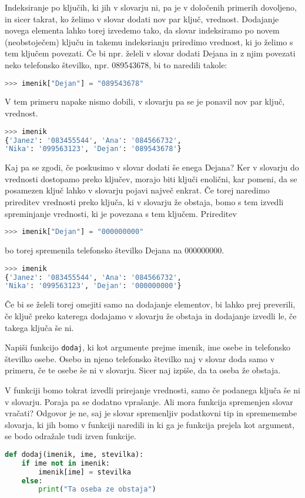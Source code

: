 Indeksiranje po ključih, ki jih v slovarju ni, pa je v določenih primerih dovoljeno, in sicer takrat, ko želimo v slovar dodati nov par ključ, vrednost. Dodajanje novega elementa lahko torej izvedemo tako, da slovar indeksiramo po novem (neobstoječem) ključu in takemu indeksrianju priredimo vrednost, ki jo želimo s tem ključem povezati. Če bi npr. želeli v slovar dodati Dejana in z njim povezati neko telefonsko številko, npr. 089543678, bi to naredili takole:
\begin{lstlisting}[language=Python]
>>> imenik["Dejan"] = "089543678"
\end{lstlisting}
V tem primeru napake nismo dobili, v slovarju pa se je ponavil nov par ključ, vrednost.
\begin{lstlisting}[language=Python]
>>> imenik
{'Janez': '083455544', 'Ana': '084566732', 
'Nika': '099563123', 'Dejan': '089543678'}
\end{lstlisting}

Kaj pa se zgodi, če poskusimo v slovar dodati še enega Dejana? Ker v slovarju do vrednosti dostopamo preko ključev, morajo biti ključi enolični, kar pomeni, da se posamezen ključ lahko v slovarju pojavi največ enkrat. Če torej naredimo prireditev vrednosti preko ključa, ki v slovarju že obstaja, bomo s tem izvedli spreminjanje vrednosti, ki je povezana s tem ključem. Prireditev
\begin{lstlisting}[language=Python]
>>> imenik["Dejan"] = "000000000"
\end{lstlisting}
bo torej spremenila telefonsko številko Dejana na 000000000.
\begin{lstlisting}[language=Python]
>>> imenik
{'Janez': '083455544', 'Ana': '084566732', 
'Nika': '099563123', 'Dejan': '000000000'}
\end{lstlisting}

Če bi se želeli torej omejiti samo na dodajanje elementov, bi lahko prej preverili, če ključ preko katerega dodajamo v slovarju že obstaja in dodajanje izvedli le, če takega ključa še ni.
\begin{zgled}
Napiši funkcijo \texttt{dodaj}, ki kot argumente prejme imenik, ime osebe in telefonsko številko osebe. Osebo in njeno telefonsko številko naj v slovar doda samo v primeru, če te osebe še ni v slovarju. Sicer naj izpiše, da ta oseba že obstaja.
\end{zgled}
\begin{resitev}
V funkciji bomo tokrat izvedli prirejanje vrednosti, samo če podanega ključa še ni v slovarju. Poraja pa se dodatno vprašanje. Ali mora funkcija spremenjen slovar vračati? Odgovor je ne, saj je slovar spremenljiv podatkovni tip in sprememembe slovarja, ki jih bomo v funkciji naredili in ki ga je funkcija prejela kot argument, se bodo odražale tudi izven funkcije.
\begin{lstlisting}[language=Python]
def dodaj(imenik, ime, stevilka):
    if ime not in imenik:
        imenik[ime] = stevilka
    else:
        print("Ta oseba ze obstaja")
\end{lstlisting}
\end{resitev}

